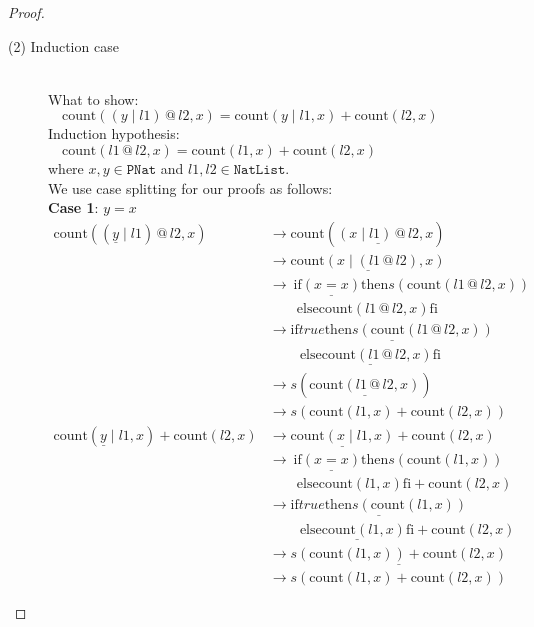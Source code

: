 \documentclass[12pt, a4paper]{article}
\newcommand{\rel}[1]{\mathrel{#1}}
\newcommand{\rmx}[1]{\mathrm{#1}}
\newcommand{\larrow}{\longrightarrow}
\newcommand{\under}{\underline}
\begin{document}
\begin{proof}
\begin{description}
\item[(2) Induction case]~\\
What to show: $\quad \rmx{count}((y \mid l1) \rel{@} l2, x) = \rmx{count}(y \mid l1, x) + \rmx{count}(l2, x)$ \\
Induction hypothesis: $\quad \rmx{count}(l1 \rel{@} l2, x) = \rmx{count}(l1, x) + \rmx{count}(l2, x)$  \\
where $x, y \in \mathtt{PNat}$ and $l1, l2 \in \mathtt{NatList}$.\\
We use case splitting for our proofs as follows: \\
\textbf{Case 1}: $y = x$
\begin{align*}
\rmx{count}((\under{y} \mid l1) \rel{@} l2, x)
	&\larrow \rmx{count}(\under{(x \mid l1) \rel{@} l2}, x) \tag{by case splitting} \\
	&\larrow \under{\rmx{count}(x \mid (l1 \rel{@} l2), x)} \tag{by @2} \\
	&\larrow\ \rel{\rmx{if}} \under{(x = x)} \rel{\rmx{then}} s(\rmx{count}(l1 \rel{@} l2, x)) \\
	&\quad \quad \rel{\rmx{else}} \rmx{count}(l1 \rel{@} l2, x) \rel{\rmx{fi}} \tag{by cnt2} \\
	&\larrow \under{\rel{\rmx{if}} true \rel{\rmx{then}} s(\rmx{count}(l1 \rel{@} l2, x))} \\
	&\quad \quad\ \under{\rel{\rmx{else}} \rmx{count}(l1 \rel{@} l2, x) \rel{\rmx{fi}}} \tag{by equality} \\
	&\larrow s(\under{\rmx{count}(l1 \rel{@} l2, x)}) \tag{by if1} \\
	&\larrow s(\rmx{count}(l1, x) + \rmx{count}(l2, x)) \tag{by IH} \\
\rmx{count}(\under{y} \mid l1, x) + \rmx{count}(l2, x)
	&\larrow \under{\rmx{count}(x \mid l1, x)} + \rmx{count}(l2, x) \tag{by case splitting} \\
	&\larrow\ \rel{\rmx{if}} \under{(x = x)} \rel{\rmx{then}} s(\rmx{count}(l1, x)) \\
	&\quad \quad \rel{\rmx{else}} \rmx{count}(l1, x) \rel{\rmx{fi}} + \rmx{count}(l2, x) \tag{by cnt2} \\
	&\larrow \under{\rel{\rmx{if}} true \rel{\rmx{then}} s(\rmx{count}(l1, x))} \\
	&\quad \quad\ \under{\rel{\rmx{else}} \rmx{count}(l1, x) \rel{\rmx{fi}}} + \rmx{count}(l2, x) \tag{by equality} \\
	&\larrow \under{s(\rmx{count}(l1, x)) + \rmx{count}(l2, x)} \tag{by if1} \\
	&\larrow s(\rmx{count}(l1, x) + \rmx{count}(l2, x)) \tag{by +2}
\end{align*}


\end{description}
\end{proof}
\end{document}
